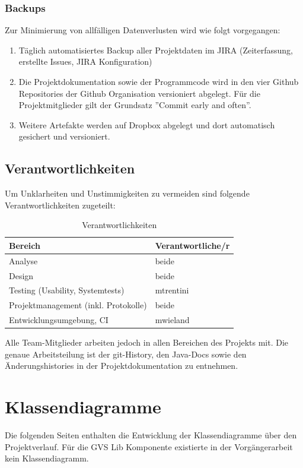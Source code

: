 \documentclass[11pt,a4paper,english,oneside]{book}
\numberwithin{equation}{chapter}
\begin{document}
	\subsection{Backups}
	\label{sec:backup}
	Zur Minimierung von allfälligen Datenverlusten wird wie folgt vorgegangen:
	
	\begin{enumerate}
		\item Täglich automatisiertes Backup aller Projektdaten im JIRA \cite{jira} (Zeiterfassung, erstellte Issues, JIRA Konfiguration)
		\item Die Projektdokumentation sowie der Programmcode wird in den vier Github Repositories der Github Organisation \cite{github} versioniert abgelegt. Für die Projektmitglieder gilt der Grundsatz ''Commit early and often''.
		\item Weitere Artefakte werden auf Dropbox \cite{dropbox} abgelegt und dort automatisch gesichert und versioniert.
	\end{enumerate}
	
	
	
	\section{Verantwortlichkeiten}
	Um Unklarheiten und Unstimmigkeiten zu vermeiden sind folgende Verantwortlichkeiten zugeteilt:
	
	\begin{table}[h!]
		\centering
		\begin{tabular}{l l}
			\toprule 
			Bereich & Verantwortliche/r \\
			\toprule 
			Analyse & beide \\
			Design & beide \\ 
			Testing (Usability, Systemtests) & mtrentini \\
			Projektmanagement (inkl. Protokolle) & beide \\
			Entwicklungsumgebung, CI & mwieland \\
			\bottomrule 
		\end{tabular} 
		\caption{Verantwortlichkeiten} 
	\end{table}
	
	Alle Team-Mitglieder arbeiten jedoch in allen Bereichen des Projekts mit. 
	Die genaue Arbeitsteilung ist der git-History, den Java-Docs sowie den Änderungshistories in der Projektdokumentation zu entnehmen.
	
	\chapter{Klassendiagramme} \label{ch:class-diagram}
	Die folgenden Seiten enthalten die Entwicklung der Klassendiagramme über den Projektverlauf. Für die GVS Lib Komponente existierte in der Vorgängerarbeit kein Klassendiagramm.
	
\end{document}
